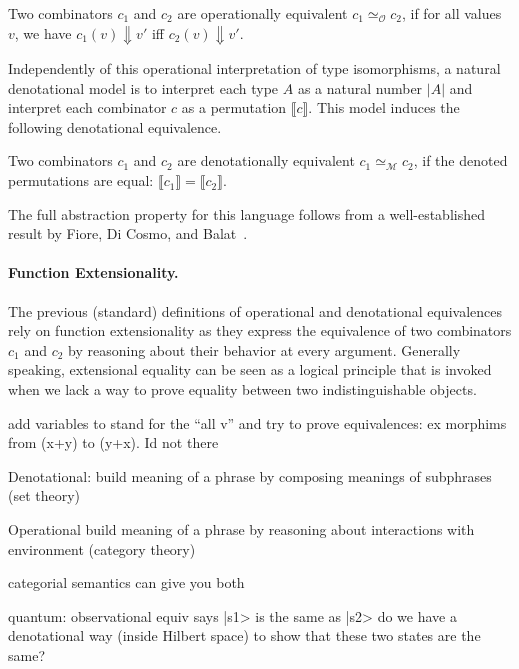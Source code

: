 \begin{definition}
  Two combinators $c_1$ and $c_2$ are operationally equivalent
  $c_1 \simeq_{\mathcal{O}} c_2$, if for all values $v$, we have
  $c_1(v) \Downarrow v'$ iff $c_2(v) \Downarrow v'$.
\end{definition}

Independently of this operational interpretation of type isomorphisms, a natural
denotational model is to interpret each type $A$ as a natural number $|A|$ and
interpret each combinator $c$ as a permutation $\llbracket c \rrbracket$. This
model induces the following denotational equivalence.

\begin{definition}
  Two combinators $c_1$ and $c_2$ are denotationally equivalent
  $c_1 \simeq_{\mathcal{M}} c_2$, if the denoted permutations are equal:
  $\llbracket c_1 \rrbracket = \llbracket c_2 \rrbracket$.
\end{definition}

The full abstraction property for this language follows from a well-established
result by Fiore, Di Cosmo, and Balat~\cite{fiore-remarks}.

\paragraph*{Function Extensionality.} The previous (standard) definitions of
operational and denotational equivalences rely on function extensionality as
they express the equivalence of two combinators $c_1$ and $c_2$ by reasoning
about their behavior at every argument. Generally speaking, extensional equality
can be seen as a logical principle that is invoked when we lack a way to prove
equality between two indistinguishable objects.

add variables to stand for the ``all v'' and try to prove equivalences: ex
morphims from (x+y) to (y+x). Id not there

Denotational: build meaning of a phrase by composing meanings of subphrases (set theory)

Operational build meaning of a phrase by reasoning about interactions with
environment (category theory)

categorial semantics can give you both

quantum: observational equiv says |s1> is the same as |s2>
do we have a denotational way (inside Hilbert space) to show that these two
states are the same?

